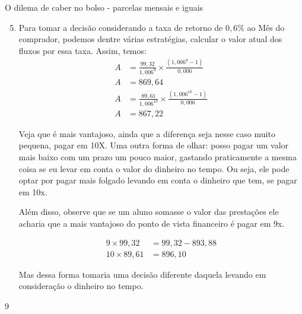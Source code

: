 \begin{answer}{O dilema de caber no bolso - parcelas mensais e iguais}
{
\begin{enumerate}\setcounter{enumi}{4}
\item Para tomar a decisão considerando a taxa de retorno de $0{,}6\%$ ao Mês do comprador, podemos dentre várias estratégias, calcular o valor atual dos fluxos por essa taxa. Assim, temos:
\begin{align*}
A&=\frac{99{,}32}{1{,}006^9}\times\frac{(1{,}006^9-1)}{0{,}006}\\
A&=869{,}64\\
A&=\frac{89{,}61}{1{,}006^10}\times\frac{(1{,}006^10-1)}{0{,}006}\\
A&=867{,}22
\end{align*}

Veja que é mais vantajoso, ainda que a diferença seja nesse caso muito pequena, pagar em 10X. Uma outra forma de olhar: posso pagar um valor mais baixo com um prazo um pouco maior, gastando praticamente a mesma coisa se eu levar em conta o valor do dinheiro no tempo. Ou seja, ele pode optar por pagar mais folgado levando em conta o dinheiro que tem, se pagar em 10x.

Além disso, observe que se um aluno somasse o valor das prestações ele acharia que a mais vantajoso do ponto de vista financeiro é pagar em 9x. 

\begin{align*}
9\times99{,}32&=99{,}32-893{,}88\\
10\times89{,}61&=896{,}10
\end{align*}

Mas dessa forma tomaria uma decisão diferente daquela levando em consideração o dinheiro no tempo. 
\end{enumerate}
}{9}
\end{answer}

